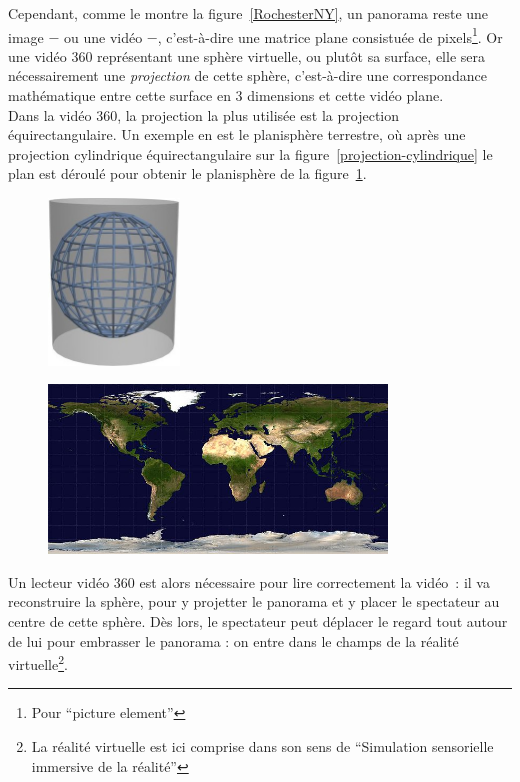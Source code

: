 \newline
Cependant, comme le montre la figure~\ref{RochesterNY}, un panorama reste une image
$-$ ou une vidéo $-$, c'est-à-dire une matrice plane consistuée de pixels\footnote{Pour
 \enquote{picture element}}. Or une vidéo 360 représentant une sphère virtuelle, ou
plutôt sa surface, elle sera nécessairement une \emph{projection} de cette sphère, 
c'est-à-dire une correspondance mathématique entre cette surface en 3 dimensions 
et cette vidéo plane\cite{projection-cartographique}.\\
Dans la vidéo 360, la projection la plus utilisée est la projection équirectangulaire\cite{what-is-equirectangular}.
Un exemple en est le planisphère terrestre, où après une projection cylindrique équirectangulaire
sur la figure~\ref{projection-cylindrique} le plan est déroulé pour obtenir le 
planisphère de la figure~\ref{planisphère}.
\begin{figure}
  \centering
  \begin{minipage}[t]{0.4\textwidth}
    \centering
    \includegraphics[width=3.5cm]{images/Projection-cylindrique.jpg}
    \label{projection-cylindrique}
  \end{minipage}%
  \begin{minipage}[t]{0.6\textwidth}
    \centering
    \includegraphics[width=9cm]{images/Equirectangular-projection.jpg}
    \label{planisphère}
  \end{minipage}
\end{figure}
\newline
Un lecteur vidéo 360 est alors nécessaire pour lire correctement la vidéo~: 
il va reconstruire la sphère, pour y projetter le panorama et y placer le
spectateur au centre de cette sphère. Dès lors, le spectateur peut déplacer le 
regard tout autour de lui pour embrasser le panorama : on entre dans le champs de 
la réalité virtuelle\footnote{La réalité virtuelle est ici comprise dans son sens
  de \enquote{Simulation sensorielle immersive de la réalité}\cite{definition-rv}}.

